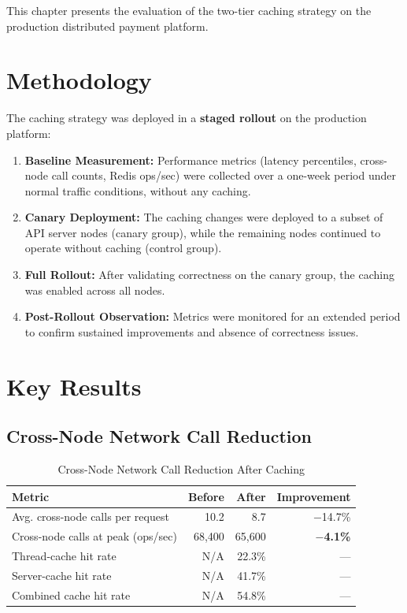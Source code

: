 \documentclass[12pt,a4paper]{report}
\begin{document}
This chapter presents the evaluation of the two-tier caching strategy on the production distributed payment platform.

\section{Methodology}

The caching strategy was deployed in a \textbf{staged rollout} on the production platform:

\begin{enumerate}
    \item \textbf{Baseline Measurement:} Performance metrics (latency percentiles, cross-node call counts, Redis ops/sec) were collected over a one-week period under normal traffic conditions, without any caching.
    \item \textbf{Canary Deployment:} The caching changes were deployed to a subset of API server nodes (canary group), while the remaining nodes continued to operate without caching (control group).
    \item \textbf{Full Rollout:} After validating correctness on the canary group, the caching was enabled across all nodes.
    \item \textbf{Post-Rollout Observation:} Metrics were monitored for an extended period to confirm sustained improvements and absence of correctness issues.
\end{enumerate}

\section{Key Results}

\subsection{Cross-Node Network Call Reduction}

\begin{table}[h]
\centering
\begin{tabular}{@{} l r r r @{}}
\toprule
\textbf{Metric} & \textbf{Before} & \textbf{After} & \textbf{Improvement} \\
\midrule
Avg. cross-node calls per request & 10.2 & 8.7 & $-$14.7\% \\
Cross-node calls at peak (ops/sec) & 68,400 & 65,600 & $-$\textbf{4.1\%} \\
Thread-cache hit rate & N/A & 22.3\% & — \\
Server-cache hit rate & N/A & 41.7\% & — \\
Combined cache hit rate & N/A & 54.8\% & — \\
\bottomrule
\end{tabular}
\caption{Cross-Node Network Call Reduction After Caching}
\label{tab:network-call-reduction}
\end{table}
\end{document}

